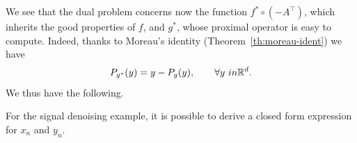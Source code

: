\documentclass{report}
\begin{document}
We see that the dual problem concerns now the function $f^*\circ (-A^\top)$, which inherits the good properties of $f$, and $g^*$, whose proximal operator is easy to compute. Indeed, thanks to Moreau's identity (Theorem~\ref{th:moreau-ident}) we have 
\begin{equation}
	P_{g^*}(y) = y - P_g(y), \qquad \forall y\ in \mathbb{R}^d.
\end{equation}
We thus have the following.


\begin{remark}
	For the signal denoising example, it is possible to derive a closed form expression for $x_n$ and $y_n$.
\end{remark}
\end{document}
